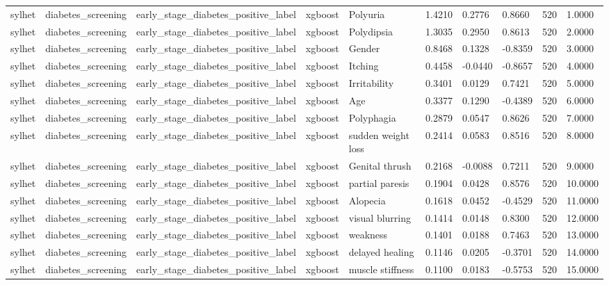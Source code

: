 \begin{tabular}{llllllllll}
sylhet & diabetes\_screening & early\_stage\_diabetes\_positive\_label & xgboost & Polyuria & 1.4210 & 0.2776 & 0.8660 & 520 & 1.0000 \\
sylhet & diabetes\_screening & early\_stage\_diabetes\_positive\_label & xgboost & Polydipsia & 1.3035 & 0.2950 & 0.8613 & 520 & 2.0000 \\
sylhet & diabetes\_screening & early\_stage\_diabetes\_positive\_label & xgboost & Gender & 0.8468 & 0.1328 & -0.8359 & 520 & 3.0000 \\
sylhet & diabetes\_screening & early\_stage\_diabetes\_positive\_label & xgboost & Itching & 0.4458 & -0.0440 & -0.8657 & 520 & 4.0000 \\
sylhet & diabetes\_screening & early\_stage\_diabetes\_positive\_label & xgboost & Irritability & 0.3401 & 0.0129 & 0.7421 & 520 & 5.0000 \\
sylhet & diabetes\_screening & early\_stage\_diabetes\_positive\_label & xgboost & Age & 0.3377 & 0.1290 & -0.4389 & 520 & 6.0000 \\
sylhet & diabetes\_screening & early\_stage\_diabetes\_positive\_label & xgboost & Polyphagia & 0.2879 & 0.0547 & 0.8626 & 520 & 7.0000 \\
sylhet & diabetes\_screening & early\_stage\_diabetes\_positive\_label & xgboost & sudden weight loss & 0.2414 & 0.0583 & 0.8516 & 520 & 8.0000 \\
sylhet & diabetes\_screening & early\_stage\_diabetes\_positive\_label & xgboost & Genital thrush & 0.2168 & -0.0088 & 0.7211 & 520 & 9.0000 \\
sylhet & diabetes\_screening & early\_stage\_diabetes\_positive\_label & xgboost & partial paresis & 0.1904 & 0.0428 & 0.8576 & 520 & 10.0000 \\
sylhet & diabetes\_screening & early\_stage\_diabetes\_positive\_label & xgboost & Alopecia & 0.1618 & 0.0452 & -0.4529 & 520 & 11.0000 \\
sylhet & diabetes\_screening & early\_stage\_diabetes\_positive\_label & xgboost & visual blurring & 0.1414 & 0.0148 & 0.8300 & 520 & 12.0000 \\
sylhet & diabetes\_screening & early\_stage\_diabetes\_positive\_label & xgboost & weakness & 0.1401 & 0.0188 & 0.7463 & 520 & 13.0000 \\
sylhet & diabetes\_screening & early\_stage\_diabetes\_positive\_label & xgboost & delayed healing & 0.1146 & 0.0205 & -0.3701 & 520 & 14.0000 \\
sylhet & diabetes\_screening & early\_stage\_diabetes\_positive\_label & xgboost & muscle stiffness & 0.1100 & 0.0183 & -0.5753 & 520 & 15.0000 \\

\end{tabular}
